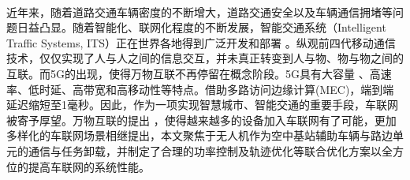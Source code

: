\makeatletter
{}
  \pagestyle{fancy}%
  \fancyhf{}
\makeatother
\newpage\ \vspace{-2.5em}
\begin{center}
\vspace{0.4cm}   %
\makeatletter
{}  %
\makeatother
\end{center}
\vspace{0.7cm}   %

近年来，随着道路交通车辆密度的不断增大，道路交通安全以及车辆通信拥堵等问题日益凸显。随着智能化、联网化程度的不断发展，智能交通系统（Intelligent Traffic Systems, ITS）正在世界各地得到广泛开发和部署
。纵观前四代移动通信技术，仅仅实现了人与人之间的信息交互，并未真正转变到人与物、物与物之间的互联。而5G的出现，使得万物互联不再停留在概念阶段。5G具有大容量
、高速率、低时延、高带宽和高移动性等特点。借助多路访问边缘计算(MEC)，端到端延迟缩短至1毫秒。因此，作为一项实现智慧城市、智能交通的重要手段，车联网被寄予厚望。万物互联的提出
，使得越来越多的设备加入车联网有了可能，更加多样化的车联网场景相继提出，本文聚焦于无人机作为空中基站辅助车辆与路边单元的通信与任务卸载，并制定了合理的功率控制及轨迹优化等联合优化方案以全方位的提高车联网的系统性能。

